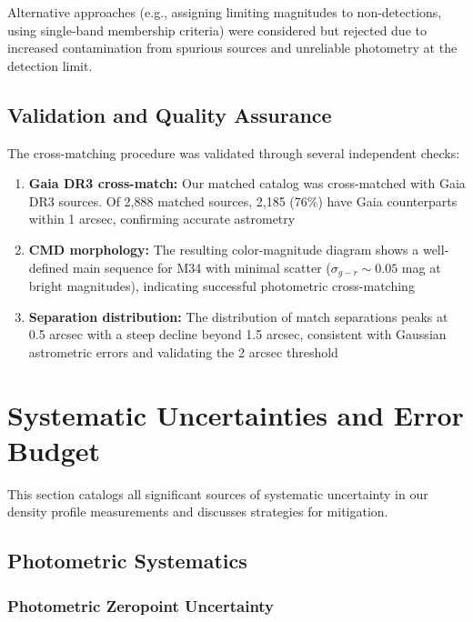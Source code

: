 \documentclass[linenumbers,trackchanges,twocolumn]{aastex701}
\begin{document}
Alternative approaches (e.g., assigning limiting magnitudes to non-detections, using single-band membership criteria) were considered but rejected due to increased contamination from spurious sources and unreliable photometry at the detection limit.

\subsection{Validation and Quality Assurance}

The cross-matching procedure was validated through several independent checks:
\begin{enumerate}
\item \textbf{Gaia DR3 cross-match:} Our matched catalog was cross-matched with Gaia DR3 sources. Of 2,888 matched sources, 2,185 (76\%) have Gaia counterparts within 1 arcsec, confirming accurate astrometry
\item \textbf{CMD morphology:} The resulting color-magnitude diagram shows a well-defined main sequence for M34 with minimal scatter ($\sigma_{g-r} \sim 0.05$ mag at bright magnitudes), indicating successful photometric cross-matching
\item \textbf{Separation distribution:} The distribution of match separations peaks at 0.5 arcsec with a steep decline beyond 1.5 arcsec, consistent with Gaussian astrometric errors and validating the 2 arcsec threshold
\end{enumerate}

\section{Systematic Uncertainties and Error Budget} \label{app:systematics}

This section catalogs all significant sources of systematic uncertainty in our density profile measurements and discusses strategies for mitigation.

\subsection{Photometric Systematics}


\subsubsection{Photometric Zeropoint Uncertainty}
\end{document}
